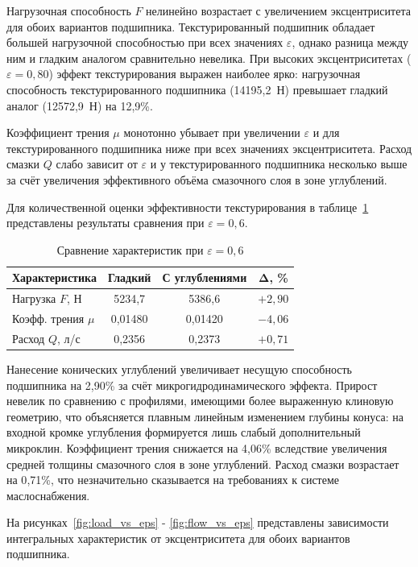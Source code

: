 Нагрузочная способность $F$ нелинейно возрастает с увеличением эксцентриситета для обоих вариантов подшипника. Текстурированный подшипник обладает большей нагрузочной способностью при всех значениях $\varepsilon$, однако разница между ним и гладким аналогом сравнительно невелика. При высоких эксцентриситетах ($\varepsilon = 0{,}80$) эффект текстурирования выражен наиболее ярко: нагрузочная способность текстурированного подшипника (14195{,}2~Н) превышает гладкий аналог (12572{,}9~Н) на 12{,}9\%.

Коэффициент трения $\mu$ монотонно убывает при увеличении $\varepsilon$ и для текстурированного подшипника ниже при всех значениях эксцентриситета. Расход смазки $Q$ слабо зависит от $\varepsilon$ и у текстурированного подшипника несколько выше за счёт увеличения эффективного объёма смазочного слоя в зоне углублений.

Для количественной оценки эффективности текстурирования в таблице~\ref{tab:comparison} представлены результаты сравнения при $\varepsilon = 0{,}6$.

\begin{table}[H]
\small
\centering
\caption{Сравнение характеристик при $\varepsilon = 0{,}6$}
\label{tab:comparison}
\begin{tabular}{|l|c|c|c|}
\hline
\textbf{Характеристика} & \textbf{Гладкий} & \textbf{С углублениями} & $\boldsymbol{\Delta}$\textbf{, \%} \\
\hline
Нагрузка $F$, Н & 5234{,}7 & 5386{,}6 & $+2{,}90$ \\
\hline
Коэфф. трения $\mu$ & 0{,}01480 & 0{,}01420 & $-4{,}06$ \\
\hline
Расход $Q$, л/с & 0{,}2356 & 0{,}2373 & $+0{,}71$ \\
\hline
\end{tabular}
\end{table}

Нанесение конических углублений увеличивает несущую способность подшипника на 2{,}90\% за счёт микрогидродинамического эффекта. Прирост невелик по сравнению с профилями, имеющими более выраженную клиновую геометрию, что объясняется плавным линейным изменением глубины конуса: на входной кромке углубления формируется лишь слабый дополнительный микроклин. Коэффициент трения снижается на 4{,}06\% вследствие увеличения средней толщины смазочного слоя в зоне углублений. Расход смазки возрастает на 0{,}71\%, что незначительно сказывается на требованиях к системе маслоснабжения.

На рисунках~\ref{fig:load_vs_eps} - \ref{fig:flow_vs_eps} представлены зависимости интегральных характеристик от эксцентриситета для обоих вариантов подшипника.

